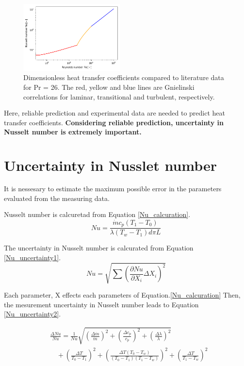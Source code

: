 \documentclass[conference]{IEEEtran}
\begin{document}
\begin{figure}[htbp]
  \centering
  \vspace{4zh}
\includegraphics[width=0.47\textwidth,natwidth=400,natheight=200]{fig/result.png}
  \caption{Dimensionless heat transfer coefficients compared to literature data for Pr = 26. The red, yellow and blue lines are Gnielinski correlations for laminar, transitional and turbulent, respectively.}
  \label{result}
\end{figure}

Here, reliable prediction and experimental data are needed to predict heat transfer coefficients.
\textbf{Considering reliable prediction, uncertainty in Nusselt number is extremely important.}

\section{Uncertainty in Nusslet number}
It is nessesary to estimate the maximum possible error in the parameters evaluated from the measuring data.

Nusselt number is calcuretad from Equation \ref{Nu_calcuration}.
\begin{equation}
Nu=\frac{\dot{m} c_{p}(T_{1}-T_{0})}{\lambda (T_{w}-T_{1}) d\pi L}\label{Nu_calcuration}
\end{equation}

The uncertainty in Nusselt number is calcurated from Equation \ref{Nu_uncertainty1}.
\begin{equation}
Nu=\sqrt{\sum \left(\frac{\partial Nu}{\partial X_{i}} \Delta X_{i}\right)^{2}}\label{Nu_uncertainty1}
\end{equation}

Each parameter, X effects each parameters of Equation.\ref{Nu_calcuration}
Then, the mesurement uncertainty in Nusselt number leads to Equation \ref{Nu_uncertainty2}.

\begin{equation}
\begin{split}
&\frac{\Delta Nu}{Nu} =\frac{1}{Nu}\sqrt{\left(\frac{\Delta \dot{m}}{\dot{m}}\right)^{2}+\left(\frac{\Delta c_{p}}{c_{p}}\right)^{2}+\left(\frac{\Delta \lambda}{\lambda}\right)^{2}}\\
&\quad +\left(\frac{\Delta T}{T_{0}-T_{1}}\right)^{2}+\left(\frac{\Delta T(T_{0}-T_{w})}{(T_{0}-T_{1})(T_{1}-T_{w})}\right)^{2}+\left(\frac{\Delta T}{T_{1}-T_{w}}\right)^{2}\\\label{Nu_uncertainty2}
\end{split}
\end{equation}
\end{document}
